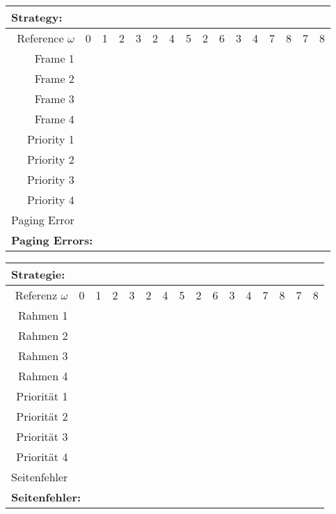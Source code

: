 \documentclass[a4paper, 11pt]{article}
\begin{document}
\setlength{\tabcolsep}{3.5mm}
\renewcommand{\arraystretch}{1.2}
\begin{center}
\begin{tabular}{|r||r|r|r|r|r|r|r|r|r|r|r|r|r|r|r|}
    \multicolumn{16}{l}{\textbf{Strategy:}}\\
    \hline
         Reference $\omega$ & 0 & 1 & 2 & 3 & 2 & 4 & 5 & 2 & 6 & 3 & 4 & 7 & 8 & 7 & 8 \\
    \hline\hline
         Frame 1    &&&&&&&&&&&&&&&   \\\hline
         Frame 2    &&&&&&&&&&&&&&&   \\\hline
         Frame 3    &&&&&&&&&&&&&&&   \\\hline
         Frame 4    &&&&&&&&&&&&&&&   \\
    \hline\hline
         Priority 1 &&&&&&&&&&&&&&&   \\\hline
         Priority 2 &&&&&&&&&&&&&&&   \\\hline
         Priority 3 &&&&&&&&&&&&&&&   \\\hline
         Priority 4 &&&&&&&&&&&&&&&   \\
    \hline\hline
         Paging Error  &&&&&&&&&&&&&&&   \\
    \hline
    \multicolumn{16}{l}{\textbf{Paging Errors:}}\\
\end{tabular}
\end{center}

\vfill

\begin{center}
\begin{tabular}{|r||r|r|r|r|r|r|r|r|r|r|r|r|r|r|r|}
    \multicolumn{16}{l}{\textbf{Strategie:}}\\
    \hline
         Referenz $\omega$ & 0 & 1 & 2 & 3 & 2 & 4 & 5 & 2 & 6 & 3 & 4 & 7 & 8 & 7 & 8 \\
    \hline\hline
         Rahmen 1    &   &   &   &   &   &   &   &   &   &   &   &   &   &   &   \\\hline
         Rahmen 2    &   &   &   &   &   &   &   &   &   &   &   &   &   &   &   \\\hline
         Rahmen 3    &   &   &   &   &   &   &   &   &   &   &   &   &   &   &   \\\hline
         Rahmen 4    &   &   &   &   &   &   &   &   &   &   &   &   &   &   &   \\
    \hline\hline
         Priorität 1 &   &   &   &   &   &   &   &   &   &   &   &   &   &   &   \\\hline
         Priorität 2 &   &   &   &   &   &   &   &   &   &   &   &   &   &   &   \\\hline
         Priorität 3 &   &   &   &   &   &   &   &   &   &   &   &   &   &   &   \\\hline
         Priorität 4 &   &   &   &   &   &   &   &   &   &   &   &   &   &   &   \\
    \hline\hline
         Seitenfehler  &   &   &   &   &   &   &   &   &   &   &   &   &   &   &   \\
    \hline
    \multicolumn{16}{l}{\textbf{Seitenfehler:}}\\
\end{tabular}
\end{center}
\end{document}
